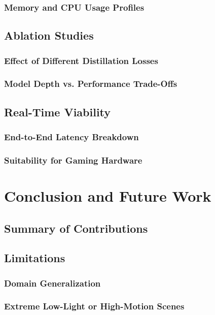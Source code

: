 \documentclass[a4paper,12pt]{report}
\begin{document}
\subsection{Memory and CPU Usage Profiles}

\section{Ablation Studies}
\subsection{Effect of Different Distillation Losses}
\subsection{Model Depth vs. Performance Trade-Offs}

\section{Real-Time Viability}
\subsection{End-to-End Latency Breakdown}
\subsection{Suitability for Gaming Hardware}

\chapter{Conclusion and Future Work}
\section{Summary of Contributions}
\section{Limitations}
\subsection{Domain Generalization}
\subsection{Extreme Low-Light or High-Motion Scenes}
\end{document}
